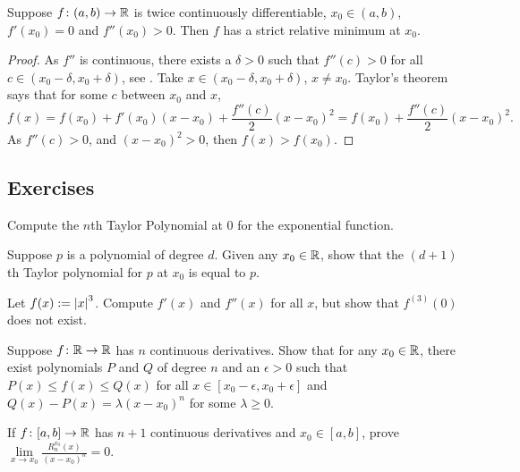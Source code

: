 \begin{prop}
Suppose $f \colon (a,b) \to {\mathbb{R}}$ is twice continuously differentiable,
$x_0 \in (a,b)$, $f'(x_0) = 0$ and $f''(x_0) > 0$.  Then $f$ has a strict relative
minimum at $x_0$.
\end{prop}

\begin{proof}
As $f''$ is continuous, there exists a $\delta > 0$
such that $f''(c) > 0$ for all $c \in (x_0-\delta,x_0+\delta)$,
see .
Take $x \in (x_0-\delta,x_0+\delta)$, $x \not= x_0$.
Taylor's theorem says that for some $c$ between $x_0$ and $x$,
\begin{equation*}
f(x) 
=
f(x_0) + f'(x_0) (x-x_0) +
\frac{f''(c)}{2}{(x-x_0)}^{2} 
=
f(x_0) + \frac{f''(c)}{2}{(x-x_0)}^{2}  .
\end{equation*}
As $f''(c) > 0$, and ${(x-x_0)}^2 > 0$, then $f(x) > f(x_0)$.
\end{proof}

\subsection{Exercises}

\begin{exercise}
Compute the $n$th Taylor Polynomial at $0$ for the exponential function.
\end{exercise}

\begin{exercise}
Suppose $p$ is a polynomial of degree $d$.  Given any $x_0 \in {\mathbb{R}}$,
show that
the $(d+1)$th Taylor polynomial for $p$ at $x_0$ is equal to $p$.
\end{exercise}

\begin{exercise}
Let $f(x) := \left\lvert {x} \right\rvert^3$.  Compute $f'(x)$ and $f''(x)$ for all $x$,
but show that $f^{(3)}(0)$ does not exist.
\end{exercise}

\begin{exercise}
Suppose $f \colon {\mathbb{R}} \to {\mathbb{R}}$ has $n$ continuous derivatives.  Show
that for any $x_0 \in {\mathbb{R}}$,
there exist polynomials $P$ and $Q$ of degree $n$ and 
an $\epsilon > 0$ such that $P(x) \leq f(x) \leq Q(x)$ for all $x \in
[x_0-\epsilon,x_0+\epsilon]$  and
$Q(x)-P(x) = \lambda {(x-x_0)}^n$ for some $\lambda \geq 0$.
\end{exercise}

\begin{exercise}
If $f \colon [a,b] \to {\mathbb{R}}$ has $n+1$ continuous derivatives
and $x_0 \in [a,b]$,
prove
$\lim\limits_{x\to x_0} \frac{R_n^{x_0}(x)}{{(x-x_0)}^n} = 0$.
\end{exercise}

